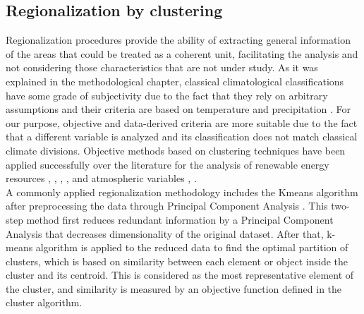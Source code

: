 \subsection{Regionalization by clustering}

Regionalization procedures provide the ability of extracting general information of the areas that could be treated as a coherent unit, facilitating the analysis and not considering those characteristics that are not under study. As it was explained in the methodological chapter, classical climatological classifications have some grade of subjectivity due to the fact that they rely on arbitrary assumptions \cite*{Kottek2006} and their criteria are based on temperature and precipitation \cite*{trewartha1980koppen}. For our purpose, objective and data-derived criteria are more suitable due to the fact that a different variable is analyzed and its classification does not match classical climate divisions. Objective methods based on clustering techniques have been applied successfully over the literature for the analysis of renewable energy resources \cite*{Polo2015}, \cite*{Zagouras2013}, \cite*{Zagouras2014}, \cite*{Zagouras2014b}, \cite*{gomez2015characterization} and atmospheric variables \cite*{Argueso2011}, \cite*{garcia2012seasonal}. \\


A commonly applied regionalization methodology includes the Kmeans algorithm after preprocessing the data through Principal Component Analysis \cite*{Ding2004}. This two-step method first reduces redundant information by a Principal Component Analysis that decreases dimensionality of the original dataset. After that, k-means algorithm is applied to the reduced data to find the optimal partition of clusters, which is based on similarity between each element or object inside the cluster and its centroid. This is considered as the most representative element of the cluster, and similarity is measured by an objective function defined in the cluster algorithm.\\

